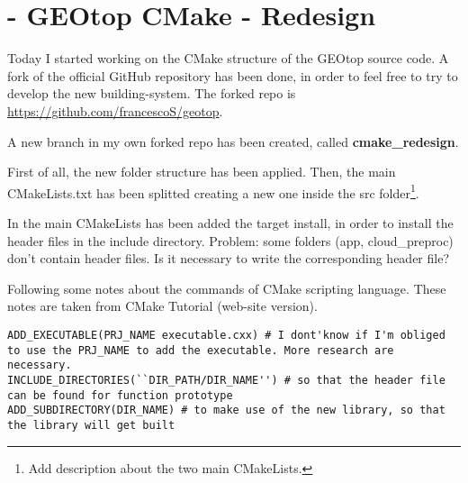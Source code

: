 \section{ - GEOtop CMake -
  Redesign}\label{sec:20150709}

Today I started working on the CMake structure of the GEOtop source
code. A fork of the official GitHub repository has been done, in order
to feel free to try to develop the new building-system. The forked
repo is \url{https://github.com/francescoS/geotop}.

A new branch in my own forked repo has been created, called
\textbf{cmake\_redesign}.

First of all, the new folder structure has been applied. Then, the
main CMakeLists.txt has been splitted creating a new one inside the
src folder\footnote{Add description about the two main CMakeLists.}.

In the main CMakeLists has been added the target install, in order to
install the header files in the include directory. Problem: some
folders (app, cloud\_preproc) don't contain header files. Is it
necessary to write the corresponding header file?

Following some notes about the commands of CMake scripting
language. These notes are taken from CMake Tutorial (web-site
version).

\begin{fullwidth}
  \begin{lstlisting}[style=cmakeStyle]
ADD_EXECUTABLE(PRJ_NAME executable.cxx) # I dont'know if I'm obliged to use the PRJ_NAME to add the executable. More research are necessary.
INCLUDE_DIRECTORIES(``DIR_PATH/DIR_NAME'') # so that the header file can be found for function prototype
ADD_SUBDIRECTORY(DIR_NAME) # to make use of the new library, so that the library will get built
  \end{lstlisting}
\end{fullwidth}